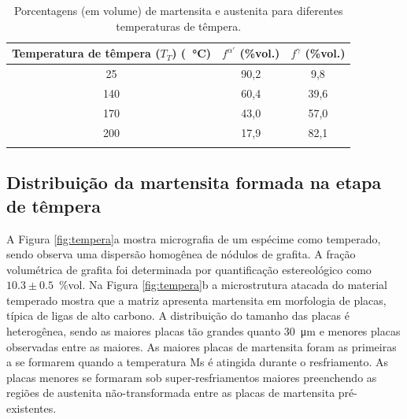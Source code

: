 \begin{table}
  \caption{Porcentagens (em volume) de martensita e austenita para diferentes temperaturas de têmpera.}
  \begin{tabular}{c c c}
  \thickhline
  Temperatura de têmpera ($T_T$) (\SI{}{\degreeCelsius}) & $f^{\alpha'}$ (\%vol.) & $f^\gamma$ (\%vol.)\\
  \hline
  25 & 90,2 & 9,8\\
  140 & 60,4 & 39,6\\ 
  170 & 43,0 & 57,0\\
  200 & 17,9 & 82,1\\
  \thickhline
  \end{tabular}
  \label{tab:austRetida}
\end{table}

\subsection{Distribuição da martensita formada na etapa de têmpera}

A Figura \ref{fig:tempera}a mostra micrografia de um espécime como temperado, sendo observa uma dispersão homogênea de nódulos de grafita. A fração volumétrica de grafita foi determinada por quantificação estereológico como $10.3 \pm 0.5$~\%vol. Na Figura \ref{fig:tempera}b a microstrutura atacada do material temperado mostra que a matriz apresenta martensita em morfologia de placas, típica de ligas de alto carbono. A distribuição do tamanho das placas é heterogênea, sendo as maiores placas tão grandes quanto \SI{30}{\micro\meter} e menores placas observadas entre as maiores. As maiores placas de martensita foram as primeiras a se formarem quando a temperatura Ms é atingida durante o resfriamento. As placas menores se formaram sob super-resfriamentos maiores preenchendo as regiões de austenita não-transformada entre as placas de martensita pré-existentes.

